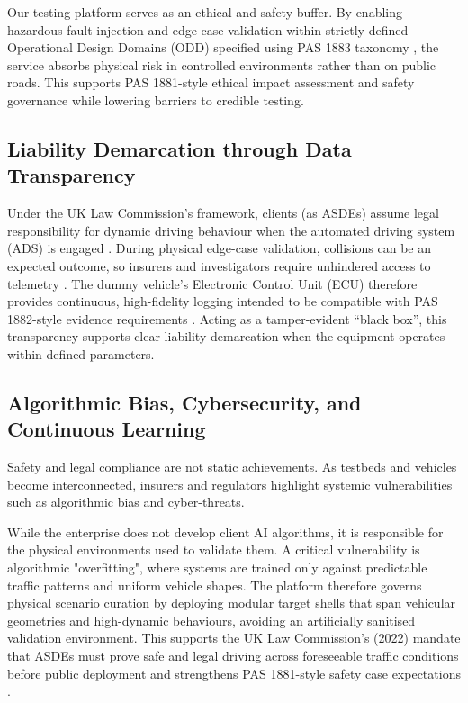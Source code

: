 \documentclass[11pt, a4paper]{report}
\numberwithin{equation}{section}
\begin{document}
\begin{refsection}
Our testing platform serves as an ethical and safety buffer. By enabling hazardous fault injection and edge-case validation within strictly defined Operational Design Domains (ODD) specified using PAS 1883 taxonomy \cite{pas1883}, the service absorbs physical risk in controlled environments rather than on public roads. This supports PAS 1881-style ethical impact assessment and safety governance \cite{pas1881} while lowering barriers to credible testing.

\subsection{Liability Demarcation through Data Transparency}

Under the UK Law Commission's framework, clients (as ASDEs) assume legal responsibility for dynamic driving behaviour when the automated driving system (ADS) is engaged \cite{lawcom_avs_2024}. During physical edge-case validation, collisions can be an expected outcome, so insurers and investigators require unhindered access to telemetry \cite{thatcham_2026}. The dummy vehicle's Electronic Control Unit (ECU) therefore provides continuous, high-fidelity logging intended to be compatible with PAS 1882-style evidence requirements \cite{pas1882}. Acting as a tamper-evident ``black box'', this transparency supports clear liability demarcation when the equipment operates within defined parameters.

\subsection{Algorithmic Bias, Cybersecurity, and Continuous Learning}

Safety and legal compliance are not static achievements. As testbeds and vehicles become interconnected, insurers and regulators highlight systemic vulnerabilities such as algorithmic bias and cyber-threats.

While the enterprise does not develop client AI algorithms, it is responsible for the physical environments used to validate them. A critical vulnerability is algorithmic "overfitting", where systems are trained only against predictable traffic patterns and uniform vehicle shapes. The platform therefore governs physical scenario curation by deploying modular target shells that span vehicular geometries and high-dynamic behaviours, avoiding an artificially sanitised validation environment. This supports the UK Law Commission’s (2022) mandate that ASDEs must prove safe and legal driving across foreseeable traffic conditions before public deployment \cite[pp.~49, 81--82, 87]{lawcom_2022} and strengthens PAS 1881-style safety case expectations \cite{pas1881}.


\end{refsection}
\end{document}
